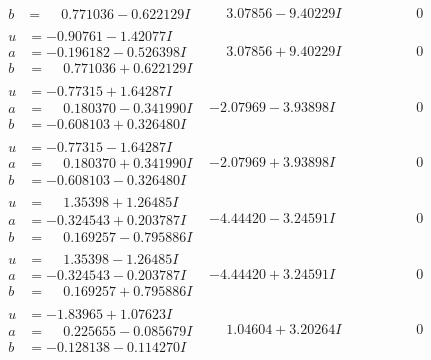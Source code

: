 \documentclass[1p]{elsarticle_modified}
\theoremstyle{definition}
\begin{document}
$$\begin{array}{c|c|c}
\begin{aligned}
b &= \phantom{-}0.771036 - 0.622129 I\end{aligned}
 & \phantom{-}3.07856 - 9.40229 I & \phantom{-0.000000 } 0 \\ \hline\begin{aligned}
u &= -0.90761 - 1.42077 I \\
a &= -0.196182 - 0.526398 I \\
b &= \phantom{-}0.771036 + 0.622129 I\end{aligned}
 & \phantom{-}3.07856 + 9.40229 I & \phantom{-0.000000 } 0 \\ \hline\begin{aligned}
u &= -0.77315 + 1.64287 I \\
a &= \phantom{-}0.180370 - 0.341990 I \\
b &= -0.608103 + 0.326480 I\end{aligned}
 & -2.07969 - 3.93898 I & \phantom{-0.000000 } 0 \\ \hline\begin{aligned}
u &= -0.77315 - 1.64287 I \\
a &= \phantom{-}0.180370 + 0.341990 I \\
b &= -0.608103 - 0.326480 I\end{aligned}
 & -2.07969 + 3.93898 I & \phantom{-0.000000 } 0 \\ \hline\begin{aligned}
u &= \phantom{-}1.35398 + 1.26485 I \\
a &= -0.324543 + 0.203787 I \\
b &= \phantom{-}0.169257 - 0.795886 I\end{aligned}
 & -4.44420 - 3.24591 I & \phantom{-0.000000 } 0 \\ \hline\begin{aligned}
u &= \phantom{-}1.35398 - 1.26485 I \\
a &= -0.324543 - 0.203787 I \\
b &= \phantom{-}0.169257 + 0.795886 I\end{aligned}
 & -4.44420 + 3.24591 I & \phantom{-0.000000 } 0 \\ \hline\begin{aligned}
u &= -1.83965 + 1.07623 I \\
a &= \phantom{-}0.225655 - 0.085679 I \\
b &= -0.128138 - 0.114270 I\end{aligned}
 & \phantom{-}1.04604 + 3.20264 I & \phantom{-0.000000 } 0 \\ \hline\begin{aligned}

\end{aligned}
\end{array}$$
\end{document}
